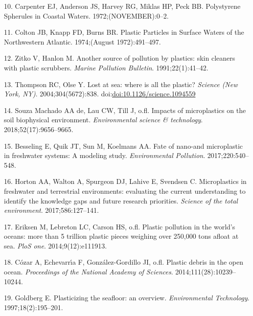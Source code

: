 \documentclass[icelandic,]{book}
\begin{document}
\leavevmode\hypertarget{ref-Waters1972}{}%
10. Carpenter EJ, Anderson JS, Harvey RG, Miklas HP, Peck BB. Polystyrene Spherules in Coastal Waters. 1972;(NOVEMBER):0--2.

\leavevmode\hypertarget{ref-Colton1974}{}%
11. Colton JB, Knapp FD, Burns BR. Plastic Particles in Surface Waters of the Northwestern Atlantic. 1974;(August 1972):491--497.

\leavevmode\hypertarget{ref-zitko1991another}{}%
12. Zitko V, Hanlon M. Another source of pollution by plastics: skin cleaners with plastic scrubbers. \emph{Marine Pollution Bulletin}. 1991;22(1):41--42.

\leavevmode\hypertarget{ref-Thompson2004lost}{}%
13. Thompson RC, Olse Y. Lost at sea: where is all the plastic? \emph{Science (New York, NY)}. 2004;304(5672):838. doi:\href{https://doi.org/doi:10.1126/science.1094559}{doi:10.1126/science.1094559}

\leavevmode\hypertarget{ref-de2018impacts}{}%
14. Souza Machado AA de, Lau CW, Till J, o.fl. Impacts of microplastics on the soil biophysical environment. \emph{Environmental science \& technology}. 2018;52(17):9656--9665.

\leavevmode\hypertarget{ref-besseling2017fate}{}%
15. Besseling E, Quik JT, Sun M, Koelmans AA. Fate of nano-and microplastic in freshwater systems: A modeling study. \emph{Environmental Pollution}. 2017;220:540--548.

\leavevmode\hypertarget{ref-horton2017microplastics}{}%
16. Horton AA, Walton A, Spurgeon DJ, Lahive E, Svendsen C. Microplastics in freshwater and terrestrial environments: evaluating the current understanding to identify the knowledge gaps and future research priorities. \emph{Science of the total environment}. 2017;586:127--141.

\leavevmode\hypertarget{ref-eriksen2014plastic}{}%
17. Eriksen M, Lebreton LC, Carson HS, o.fl. Plastic pollution in the world's oceans: more than 5 trillion plastic pieces weighing over 250,000 tons afloat at sea. \emph{PloS one}. 2014;9(12):e111913.

\leavevmode\hypertarget{ref-cozar2014plastic}{}%
18. Cózar A, Echevarrı́a F, González-Gordillo JI, o.fl. Plastic debris in the open ocean. \emph{Proceedings of the National Academy of Sciences}. 2014;111(28):10239--10244.

\leavevmode\hypertarget{ref-goldberg1997plasticizing}{}%
19. Goldberg E. Plasticizing the seafloor: an overview. \emph{Environmental Technology}. 1997;18(2):195--201.
\end{document}
